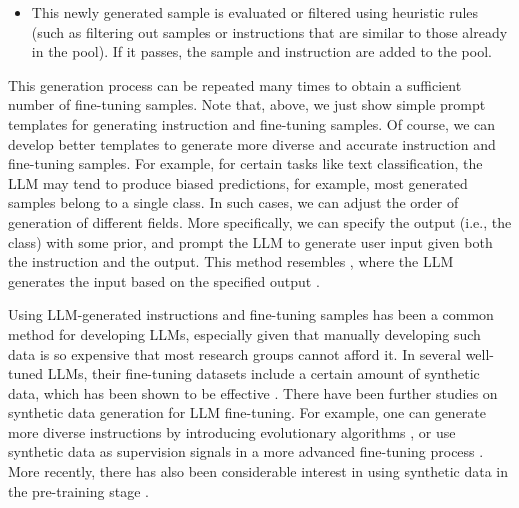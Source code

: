 \begin{itemize}
\begin{tcolorbox}
    \vspace{0.2cm}

    New Sample: $\{*\mathrm{new\text{-}instruction}*\}$

    \vspace{0.1cm}

    \underline{\hspace{2em}}

    \endgroup

    \end{tcolorbox}
    \vspace{0.5em}

\item \vspace{0.3em} This newly generated sample is evaluated or filtered using heuristic rules (such as filtering out samples or instructions that are similar to those already in the pool). If it passes, the sample and instruction are added to the pool.
\end{itemize}
\vspace{0.5em}

This generation process can be repeated many times to obtain a sufficient number of fine-tuning samples. Note that, above, we just show simple prompt templates for generating instruction and fine-tuning samples. Of course, we can develop better templates to generate more diverse and accurate instruction and fine-tuning samples. For example, for certain tasks like text classification, the LLM may tend to produce biased predictions, for example, most generated samples belong to a single class. In such cases, we can adjust the order of generation of different fields. More specifically, we can specify the output (i.e., the class) with some prior, and prompt the LLM to generate user input given both the instruction and the output. This method resembles , where the LLM generates the input based on the specified output \cite{longpre-etal:2023flan}.

Using LLM-generated instructions and fine-tuning samples has been a common method for developing LLMs, especially given that manually developing such data is so expensive that most research groups cannot afford it. In several well-tuned LLMs, their fine-tuning datasets include a certain amount of synthetic data, which has been shown to be effective \cite{ouyang-etal:2022training,taori-etal:2023alpaca,chiang-etal:2023vicuna}. There have been further studies on synthetic data generation for LLM fine-tuning. For example, one can generate more diverse instructions by introducing evolutionary algorithms \cite{xu-etal:2024wizardlm}, or use synthetic data as supervision signals in a more advanced fine-tuning process \cite{chen-etal:2024self}. More recently, there has also been considerable interest in using synthetic data in the pre-training stage \cite{gunasekar-etal:2023textbooks,allal-etal:2024cosmopedia}.

